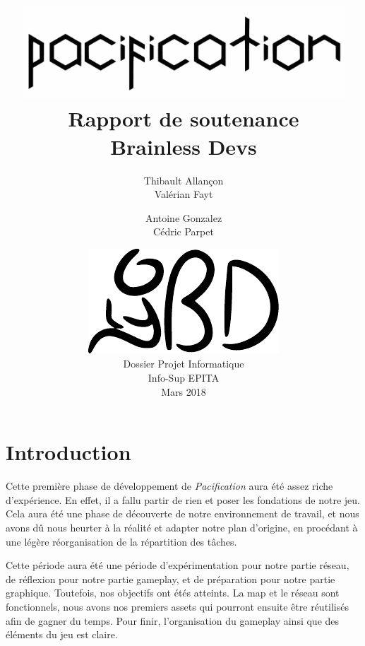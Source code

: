 \documentclass[12pt]{report}
\begin{document}
\title{
	{\vspace{3em}\protect\centering\protect\includegraphics[width=0.9\textwidth]{pacification_vector.pdf}}\\
	{\vspace{4em}\Huge Rapport de soutenance}\\
	{\large Brainless Devs}
}
\author{
	Thibault Allançon\\
	Valérian Fayt
	\and
	Antoine Gonzalez\\
	Cédric Parpet}
\date{
	{\vfill\protect\centering\protect\includegraphics{logo_short_vector.pdf}}\\
	Dossier Projet Informatique\\
	Info-Sup EPITA\\
	Mars 2018
}

\maketitle
\tableofcontents

\chapter{Introduction}

Cette première phase de développement de \textit{Pacification} aura été assez riche d'expérience. En effet, il a fallu partir de rien et poser les fondations de notre jeu. Cela aura été une phase de découverte de notre environnement de travail, et nous avons dû nous heurter à la réalité et adapter notre plan d'origine, en procédant à une légère réorganisation de la répartition des tâches.

Cette période aura été une période d'expérimentation pour notre partie réseau, de réflexion pour notre partie gameplay, et de préparation pour notre partie graphique. Toutefois, nos objectifs ont étés atteints. La map et le réseau sont fonctionnels, nous avons nos premiers assets qui pourront ensuite être réutilisés afin de gagner du temps. Pour finir, l'organisation du gameplay ainsi que des éléments du jeu est claire.
\end{document}
